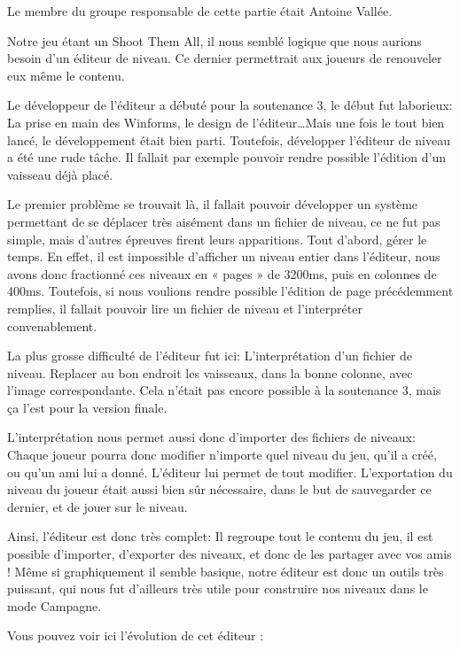 \par Le membre du groupe responsable de cette partie était Antoine Vallée.

\par Notre jeu étant un Shoot Them All, il nous semblé logique que nous aurions besoin d'un éditeur de niveau. Ce dernier permettrait aux joueurs de renouveler eux même le contenu.
\par Le développeur de l'éditeur a débuté pour la soutenance 3, le début fut laborieux: La prise en main des Winforms, le design de l'éditeur\ldots Mais une fois le tout bien lancé, le développement était bien parti. Toutefois, développer l'éditeur de niveau a été une rude tâche. Il fallait par exemple pouvoir rendre possible l'édition d'un vaisseau déjà placé.
\par Le premier problème se trouvait là, il fallait pouvoir développer un système permettant de se déplacer très aisément dans un fichier de niveau, ce ne fut pas simple, mais d'autres épreuves firent leurs apparitions. Tout d'abord, gérer le temps. En effet, il est impossible d'afficher un niveau entier dans l'éditeur, nous avons donc fractionné ces niveaux en « pages » de 3200ms, puis en colonnes de 400ms. Toutefois, si nous voulions rendre possible l'édition de page précédemment remplies, il fallait pouvoir lire un fichier de niveau et l'interpréter convenablement.
\par La plus grosse difficulté de l'éditeur fut ici: L'interprétation d'un fichier de niveau. Replacer au bon endroit les vaisseaux, dans la bonne colonne, avec l'image correspondante. Cela n'était pas encore possible à la soutenance 3, mais ça l'est pour la version finale.
\par L'interprétation nous permet aussi donc d'importer des fichiers de niveaux: Chaque joueur pourra donc modifier n'importe quel niveau du jeu, qu'il a créé, ou qu'un ami lui a donné. L'éditeur lui permet de tout modifier. L'exportation du niveau du joueur était aussi bien sûr nécessaire, dans le but de sauvegarder ce dernier, et de jouer sur le niveau.
\par Ainsi, l'éditeur est donc très complet: Il regroupe tout le contenu du jeu, il est possible d'importer, d'exporter des niveaux, et donc de les partager avec vos amis ! Même si graphiquement il semble basique, notre éditeur est donc un outils très puissant, qui nous fut d'ailleurs très utile pour construire nos niveaux dans le mode Campagne.
\par Vous pouvez voir ici l'évolution de cet éditeur :

